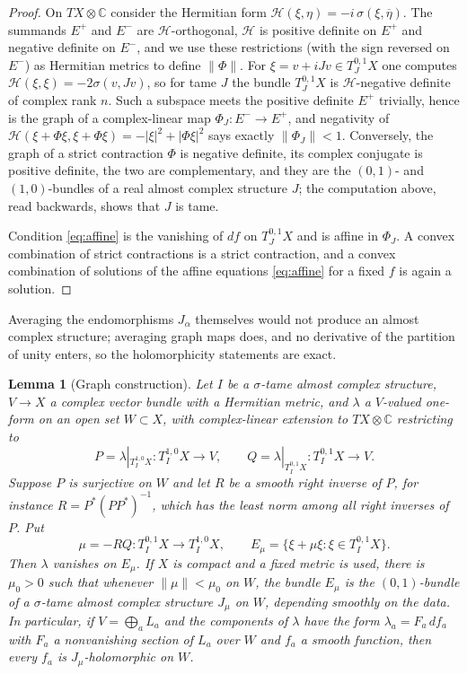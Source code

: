 \documentclass[12pt]{article}
\newtheorem{lemma}[theorem]{Lemma}
\theoremstyle{remark}
\newcommand{\C}{\mathbb C}
\begin{document}
\begin{proof}
On $TX\otimes\C$ consider the Hermitian form
$\mathcal H(\xi,\eta)=-i\,\sigma(\xi,\overline\eta)$. The summands $E^+$
and $E^-$ are $\mathcal H$-orthogonal, $\mathcal H$ is positive
definite on $E^+$ and negative definite on $E^-$, and we use these
restrictions (with the sign reversed on $E^-$) as Hermitian metrics to
define $\lVert\Phi\rVert$. For $\xi=v+iJv\in T^{0,1}_JX$ one computes
$\mathcal H(\xi,\xi)=-2\sigma(v,Jv)$, so for tame $J$ the bundle
$T^{0,1}_JX$ is $\mathcal H$-negative definite of complex rank $n$.
Such a subspace meets the positive definite $E^+$ trivially, hence is
the graph of a complex-linear map $\Phi_J\colon E^-\to E^+$, and
negativity of $\mathcal H(\xi+\Phi\xi,\xi+\Phi\xi)=-|\xi|^2+|\Phi\xi|^2$
says exactly $\lVert\Phi_J\rVert<1$. Conversely, the graph of a strict
contraction $\Phi$ is negative definite, its complex conjugate is
positive definite, the two are complementary, and they are the
$(0,1)$- and $(1,0)$-bundles of a real almost complex structure $J$;
the computation above, read backwards, shows that $J$ is tame.

Condition \eqref{eq:affine} is the vanishing of $df$ on $T^{0,1}_JX$
and is affine in $\Phi_J$. A convex combination of strict contractions
is a strict contraction, and a convex combination of solutions of the
affine equations \eqref{eq:affine} for a fixed $f$ is again a solution.
\end{proof}

Averaging the endomorphisms $J_\alpha$ themselves would not produce an
almost complex structure; averaging graph maps does, and no derivative
of the partition of unity enters, so the holomorphicity statements are
exact.

\begin{lemma}[Graph construction]\label{lem:graph}
Let $I$ be a $\sigma$-tame almost complex structure, $V\to X$ a complex
vector bundle with a Hermitian metric, and $\lambda$ a $V$-valued
one-form on an open set $W\subset X$, with complex-linear extension to
$TX\otimes\C$ restricting to
\[
 P=\lambda|_{T^{1,0}_IX}\colon T^{1,0}_IX\to V,\qquad
 Q=\lambda|_{T^{0,1}_IX}\colon T^{0,1}_IX\to V .
\]
Suppose $P$ is surjective on $W$ and let $R$ be a smooth right inverse
of $P$, for instance $R=P^*(PP^*)^{-1}$, which has the least norm among
all right inverses of $P$. Put
\begin{equation}\label{eq:graph}
 \mu=-RQ\colon T^{0,1}_IX\to T^{1,0}_IX,\qquad
 E_\mu=\{\xi+\mu\xi:\xi\in T^{0,1}_IX\}.
\end{equation}
Then $\lambda$ vanishes on $E_\mu$. If $X$ is compact and a fixed
metric is used, there is $\mu_0>0$ such that whenever
$\lVert\mu\rVert<\mu_0$ on $W$, the bundle $E_\mu$ is the $(0,1)$-bundle
of a $\sigma$-tame almost complex structure $J_\mu$ on $W$, depending
smoothly on the data. In particular, if $V=\bigoplus_aL_a$ and the
components of $\lambda$ have the form $\lambda_a=F_a\,df_a$ with $F_a$
a nonvanishing section of $L_a$ over $W$ and $f_a$ a smooth function,
then every $f_a$ is $J_\mu$-holomorphic on $W$.
\end{lemma}
\end{document}
